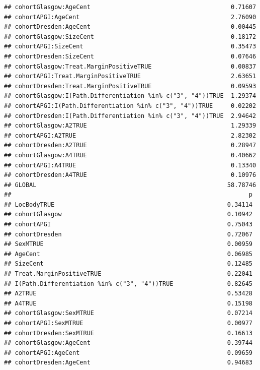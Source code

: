 \documentclass{article}\usepackage[]{graphicx}\usepackage[]{color}
\makeatletter
\newenvironment{kframe}{%
 \def\at@end@of@kframe{}%
 \ifinner\ifhmode%
  \def\at@end@of@kframe{\end{minipage}}%
  \begin{minipage}{\columnwidth}%
 \fi\fi%
 \def\FrameCommand##1{\hskip\@totalleftmargin \hskip-\fboxsep
 \colorbox{shadecolor}{##1}\hskip-\fboxsep
     \hskip-\linewidth \hskip-\@totalleftmargin \hskip\columnwidth}%
 \MakeFramed {\advance\hsize-\width
   \@totalleftmargin\z@ \linewidth\hsize
   \@setminipage}}%
 {\par\unskip\endMakeFramed%
 \at@end@of@kframe}
\newenvironment{knitrout}{}{} %
\makeatother
\begin{document}
\begin{knitrout}
\begin{kframe}
\begin{verbatim}
## cohortGlasgow:AgeCent                                       0.71607
## cohortAPGI:AgeCent                                          2.76090
## cohortDresden:AgeCent                                       0.00445
## cohortGlasgow:SizeCent                                      0.18172
## cohortAPGI:SizeCent                                         0.35473
## cohortDresden:SizeCent                                      0.07646
## cohortGlasgow:Treat.MarginPositiveTRUE                      0.00837
## cohortAPGI:Treat.MarginPositiveTRUE                         2.63651
## cohortDresden:Treat.MarginPositiveTRUE                      0.09593
## cohortGlasgow:I(Path.Differentiation %in% c("3", "4"))TRUE  1.29374
## cohortAPGI:I(Path.Differentiation %in% c("3", "4"))TRUE     0.02202
## cohortDresden:I(Path.Differentiation %in% c("3", "4"))TRUE  2.94642
## cohortGlasgow:A2TRUE                                        1.29339
## cohortAPGI:A2TRUE                                           2.82302
## cohortDresden:A2TRUE                                        0.28947
## cohortGlasgow:A4TRUE                                        0.40662
## cohortAPGI:A4TRUE                                           0.13340
## cohortDresden:A4TRUE                                        0.10976
## GLOBAL                                                     58.78746
##                                                                  p
## LocBodyTRUE                                                0.34114
## cohortGlasgow                                              0.10942
## cohortAPGI                                                 0.75043
## cohortDresden                                              0.72067
## SexMTRUE                                                   0.00959
## AgeCent                                                    0.06985
## SizeCent                                                   0.12485
## Treat.MarginPositiveTRUE                                   0.22041
## I(Path.Differentiation %in% c("3", "4"))TRUE               0.82645
## A2TRUE                                                     0.53428
## A4TRUE                                                     0.15198
## cohortGlasgow:SexMTRUE                                     0.07214
## cohortAPGI:SexMTRUE                                        0.00977
## cohortDresden:SexMTRUE                                     0.16613
## cohortGlasgow:AgeCent                                      0.39744
## cohortAPGI:AgeCent                                         0.09659
## cohortDresden:AgeCent                                      0.94683

\end{verbatim}
\end{kframe}
\end{knitrout}
\end{document}
